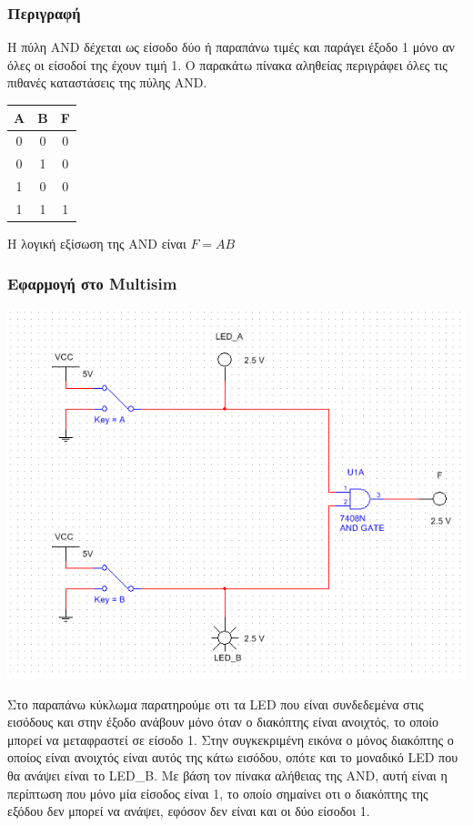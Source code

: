 \documentclass{article}
\begin{document}
\subsubsection{Περιγραφή}

Η πύλη AND δέχεται ως είσοδο δύο ή παραπάνω τιμές και παράγει έξοδο 1 μόνο αν
όλες οι είσοδοί της έχουν τιμή 1. Ο παρακάτω πίνακα αληθείας περιγράφει όλες
τις πιθανές καταστάσεις της πύλης AND.

\begin{center}
\begin{tabular}{|c|c|c|}
	\hline
	A & B & F \\
	\hline
	0 & 0 & 0 \\
	0 & 1 & 0 \\
	1 & 0 & 0 \\
	1 & 1 & 1 \\
	\hline
\end{tabular}
\end{center}

Η λογική εξίσωση της AND είναι $F = AB$

\subsubsection{Εφαρμογή στο Multisim}
\includegraphics[width=\textwidth]{./res/and.png}

Στο παραπάνω κύκλωμα παρατηρούμε οτι τα LED που είναι συνδεδεμένα στις εισόδους
και στην έξοδο ανάβουν μόνο όταν ο διακόπτης είναι ανοιχτός, το οποίο μπορεί να
μεταφραστεί σε είσοδο 1. Στην συγκεκριμένη εικόνα ο μόνος διακόπτης ο οποίος είναι
ανοιχτός είναι αυτός της κάτω εισόδου, οπότε και το μοναδικό LED που θα ανάψει
είναι το LED\_B.  
Με βάση τον πίνακα αλήθειας της AND, αυτή είναι η περίπτωση που μόνο μία είσοδος είναι
1, το οποίο σημαίνει οτι ο διακόπτης της εξόδου δεν μπορεί να ανάψει, εφόσον δεν είναι
και οι δύο είσοδοι 1.
\end{document}
